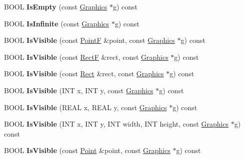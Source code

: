 \begin{DoxyCompactItemize}
B\+O\+OL {\bfseries Is\+Empty} (const \hyperlink{class_graphics}{Graphics} $\ast$g) const
\item 
\mbox{\label{class_region_ada67bad9efbbc3f9fd0f793f48955b22}} 
B\+O\+OL {\bfseries Is\+Infinite} (const \hyperlink{class_graphics}{Graphics} $\ast$g) const
\item 
\mbox{\label{class_region_a0fb77d7976f845b7fdab7aa0ede33316}} 
B\+O\+OL {\bfseries Is\+Visible} (const \hyperlink{struct_point_f}{PointF} \&point, const \hyperlink{class_graphics}{Graphics} $\ast$g) const
\item 
\mbox{\label{class_region_aaa1adf7f2f871f18777119fe5a832d9c}} 
B\+O\+OL {\bfseries Is\+Visible} (const \hyperlink{struct_rect_f}{RectF} \&rect, const \hyperlink{class_graphics}{Graphics} $\ast$g) const
\item 
\mbox{\label{class_region_aef216002644ed36c6e8f9650c1b6ef76}} 
B\+O\+OL {\bfseries Is\+Visible} (const \hyperlink{struct_rect}{Rect} \&rect, const \hyperlink{class_graphics}{Graphics} $\ast$g) const
\item 
\mbox{\label{class_region_a310f7eeee2fe893a11a2421ec2fb11e0}} 
B\+O\+OL {\bfseries Is\+Visible} (I\+NT x, I\+NT y, const \hyperlink{class_graphics}{Graphics} $\ast$g) const
\item 
\mbox{\label{class_region_ac3b0eca49ec544e7aecb9cacb203a13a}} 
B\+O\+OL {\bfseries Is\+Visible} (R\+E\+AL x, R\+E\+AL y, const \hyperlink{class_graphics}{Graphics} $\ast$g) const
\item 
\mbox{\label{class_region_afdb616da94043fdf3cd43a8c7e6a321c}} 
B\+O\+OL {\bfseries Is\+Visible} (I\+NT x, I\+NT y, I\+NT width, I\+NT height, const \hyperlink{class_graphics}{Graphics} $\ast$g) const
\item 
\mbox{\label{class_region_ae955dd777aa3f8fbf314c362ab51374c}} 
B\+O\+OL {\bfseries Is\+Visible} (const \hyperlink{struct_point}{Point} \&point, const \hyperlink{class_graphics}{Graphics} $\ast$g) const
\item 
\mbox{\label{class_region_aba3deda9bd06d435675cc36f6c354a6c}} 

\end{DoxyCompactItemize}
